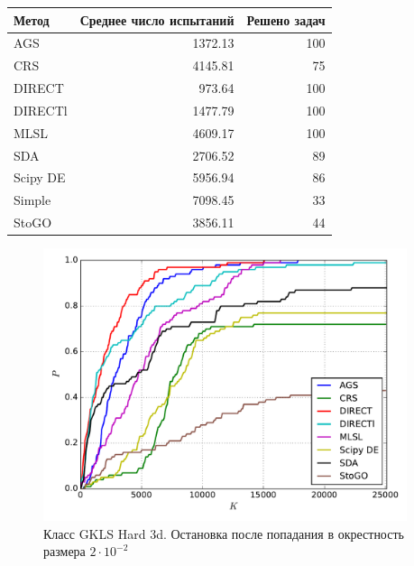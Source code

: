 \documentclass[a4paper]{article}
\begin{document}
\begin{tabular}{lrr}
\hline
 Метод    &   Среднее число испытаний &   Решено задач \\
\hline
 AGS      &                   1372.13 &            100 \\
 CRS      &                   4145.81 &             75 \\
 DIRECT   &                    973.64 &            100 \\
 DIRECTl  &                   1477.79 &            100 \\
 MLSL     &                   4609.17 &            100 \\
 SDA      &                   2706.52 &             89 \\
 Scipy DE &                   5956.94 &             86 \\
 Simple   &                   7098.45 &             33 \\
 StoGO    &                   3856.11 &             44 \\
\hline
\end{tabular}
\begin{figure}[H]
  \center
  \includegraphics[width=0.95\textwidth]{../experiments/gklsh3d/cmc.pdf}
  \caption{Класс GKLS Hard 3d. Остановка после попадания в окрестность размера $2\cdot10^{-2}$}
  \label{fig:}
\end{figure}
\end{document}

